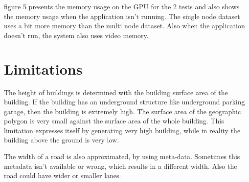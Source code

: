 figure 5 presents the memory usage on the GPU for the 2 tests and also shows the memory usage when the application isn’t running. The single node dataset uses a bit more memory than the multi node dataset. Also when the application doesn’t run, the system also uses video memory.

\section{Limitations}
\label{sec:Limitations}
The height of buildings is determined with the building surface area of the building. If the building has an underground structure like underground parking garage, then the building is extremely high. The surface area of the geographic polygon is very small against the surface area of the whole building. This limitation expresses itself by generating very high building, while in reality the building above the ground is very low.

The width of a road is also approximated, by using meta-data. Sometimes this metadata isn’t available or wrong, which results in a different width. Also the road could have wider or smaller lanes.

